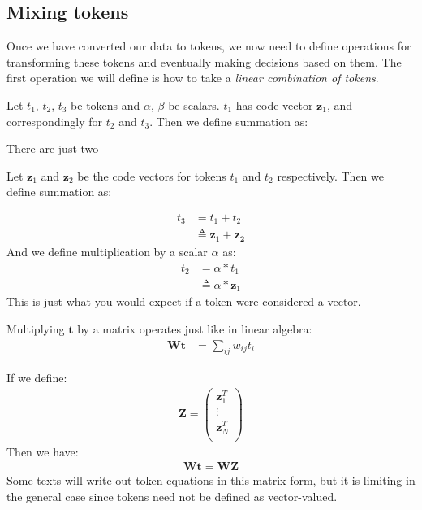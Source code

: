 

\subsection{Mixing tokens}
Once we have converted our data to tokens, we now need to define operations for transforming these tokens and eventually making decisions based on them. The first operation we will define is how to take a \textit{linear combination of tokens}.

Let $t_1$, $t_2$, $t_3$ be tokens and $\alpha$, $\beta$ be scalars. $t_1$ has code vector $\mathbf{z}_1$, and correspondingly for $t_2$ and $t_3$. Then we define summation as:

There are just two 

Let $\mathbf{z}_1$ and $\mathbf{z}_2$ be the code vectors for tokens $t_1$ and $t_2$ respectively. Then we define summation as:

\begin{align}
    t_3 &= t_1 + t_2\\
        &\triangleq \mathbf{z}_1 + \mathbf{z_2}
\end{align}
And we define multiplication by a scalar $\alpha$ as:
\begin{align}
    t_2 &= \alpha*t_1\\
        &\triangleq \alpha*\mathbf{z}_1
\end{align}
This is just what you would expect if a token were considered a vector.

Multiplying $\mathbf{t}$ by a matrix operates just like in linear algebra:
\begin{align}
    \mathbf{W}\mathbf{t} &= \sum_{ij} w_{ij} t_i
    
\end{align}

If we define:
\begin{align}
    \mathbf{Z} = 
     \begin{pmatrix}
        \mathbf{z}_1^T\\
        \vdots \\
        \mathbf{z}_N^T\\
    \end{pmatrix}
\end{align}
Then we have:
\begin{align}
    \mathbf{W}\mathbf{t} = \mathbf{W}\mathbf{Z}
\end{align}
Some texts will write out token equations in this matrix form, but it is limiting in the general case since tokens need not be defined as vector-valued.


